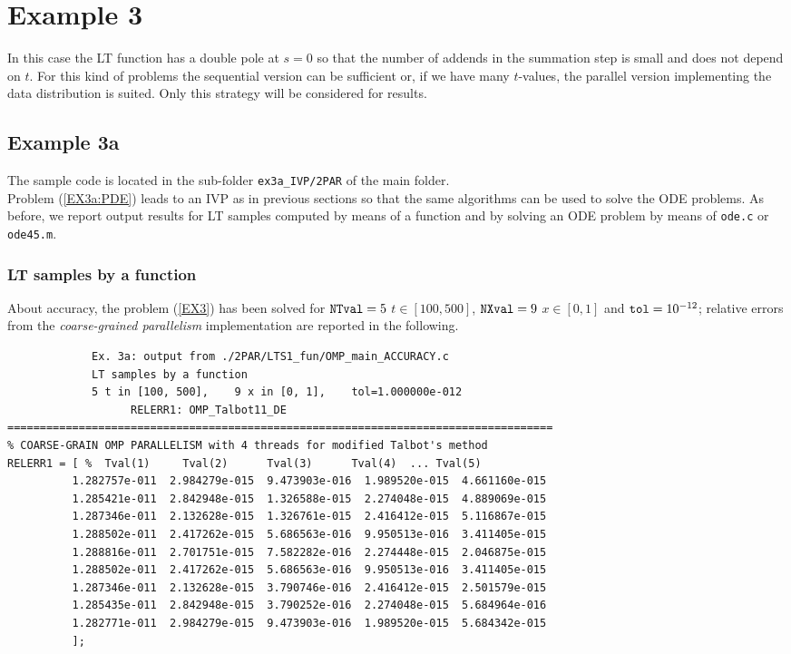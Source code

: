 \documentclass[a4paper,10pt]{report}%
\begin{document}
\section{Example 3}
In this case the LT function has a double pole at $s=0$ so that the number of addends in the summation step
is small and does not depend on $t$. For this kind of problems the sequential version can be sufficient or,
if we have many $t$-values, the parallel version implementing the data distribution is suited.
Only this strategy will be considered for results.


\subsection{Example 3a}
The sample code is located in the sub-folder {\tt ex3a\_IVP/2PAR} of the main folder.
\\
Problem (\ref{EX3a:PDE}) leads to an IVP as in previous sections so that the same algorithms can be used to
solve the ODE problems. As before, we report output results for LT samples computed by means of a function and
by solving an ODE problem by means of {\tt ode.c} or {\tt ode45.m}.

\subsubsection{LT samples by a function}
About accuracy, the problem (\ref{EX3}) has been solved for ${\tt NTval}=5$ $t\in[100, 500]$, ${\tt NXval}=9$
$x\in[0,1]$ and ${\tt tol}=10^{-12}$; relative errors from the {\em coarse-grained parallelism} implementation
are reported in the following.
\begin{lstlisting}
             Ex. 3a: output from ./2PAR/LTS1_fun/OMP_main_ACCURACY.c
             LT samples by a function
             5 t in [100, 500],    9 x in [0, 1],    tol=1.000000e-012
                   RELERR1: OMP_Talbot11_DE
====================================================================================
% COARSE-GRAIN OMP PARALLELISM with 4 threads for modified Talbot's method
RELERR1 = [ %  Tval(1)     Tval(2)      Tval(3)      Tval(4)  ... Tval(5)
          1.282757e-011  2.984279e-015  9.473903e-016  1.989520e-015  4.661160e-015
          1.285421e-011  2.842948e-015  1.326588e-015  2.274048e-015  4.889069e-015
          1.287346e-011  2.132628e-015  1.326761e-015  2.416412e-015  5.116867e-015
          1.288502e-011  2.417262e-015  5.686563e-016  9.950513e-016  3.411405e-015
          1.288816e-011  2.701751e-015  7.582282e-016  2.274448e-015  2.046875e-015
          1.288502e-011  2.417262e-015  5.686563e-016  9.950513e-016  3.411405e-015
          1.287346e-011  2.132628e-015  3.790746e-016  2.416412e-015  2.501579e-015
          1.285435e-011  2.842948e-015  3.790252e-016  2.274048e-015  5.684964e-016
          1.282771e-011  2.984279e-015  9.473903e-016  1.989520e-015  5.684342e-015
          ];
\end{lstlisting}
\end{document}

